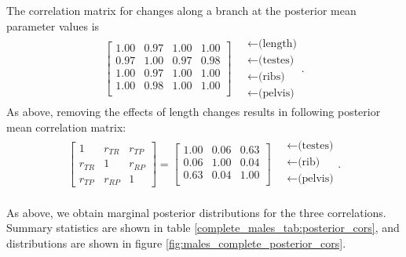 \documentclass{article}
\begin{document}
The correlation matrix for changes along a branch at the posterior mean parameter values is 
\begin{align}
\begin{bmatrix}
   1.00 & 0.97 & 1.00 & 1.00 \\ 
   0.97 & 1.00 & 0.97 & 0.98 \\ 
   1.00 & 0.97 & 1.00 & 1.00 \\ 
   1.00 & 0.98 & 1.00 & 1.00 \\ 
 \end{bmatrix}
\quad \begin{matrix}
  \leftarrow \text{(length)} \\
  \leftarrow \text{(testes)} \\
  \leftarrow \text{(ribs)} \\
  \leftarrow \text{(pelvis)} 
\end{matrix} .
\end{align}
As above, removing the effects of length changes results in following posterior mean correlation matrix:
\begin{align}
\begin{bmatrix}
  1 & r_{TR} & r_{TP} \\ 
  r_{TR} & 1 & r_{RP} \\ 
  r_{TP} & r_{RP} & 1 
 \end{bmatrix}
 =
\begin{bmatrix}
   1.00 & 0.06 & 0.63 \\ 
   0.06 & 1.00 & 0.04 \\ 
   0.63 & 0.04 & 1.00 \\ 
 \end{bmatrix}
\quad \begin{matrix}
  \leftarrow \text{(testes)} \\
  \leftarrow \text{(rib)} \\
  \leftarrow \text{(pelvis)} \\
\end{matrix}  .
\end{align}

As above, we obtain marginal posterior distributions for the three correlations.
Summary statistics are shown in table \ref{complete_males_tab:posterior_cors},
and distributions are shown in figure \ref{fig:males_complete_posterior_cors}.
\end{document}
